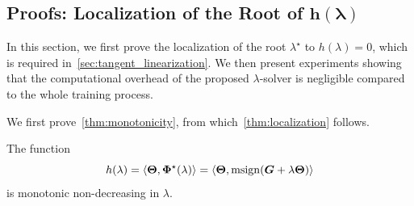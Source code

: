 \subsection{Proofs: Localization of the Root of \texorpdfstring{$\boldsymbol{h(\lambda)}$}{h(lambda)}}
\label{app:localization}

In this section, we first prove the localization of the root $\lambda^\star$ to $h(\lambda)=0$, which is required in~\cref{sec:tangent_linearization}. We then present experiments showing that the computational overhead of the proposed $\lambda$-solver is negligible compared to the whole training process.

We first prove~\cref{thm:monotonicity}, from which~\cref{thm:localization} follows.

\begin{theorem}\label{thm:monotonicity}
    The function
    \[
        h(\lambda) = \langle {\bm{\Theta}}, {\bm{\Phi}}^{\star}(\lambda) \rangle= \langle {\bm{\Theta}}
        , \operatorname{msign}({\bm{G}} + \lambda {\bm{\Theta}}) \rangle
    \]
    is monotonic non-decreasing in $\lambda$.
\end{theorem}

